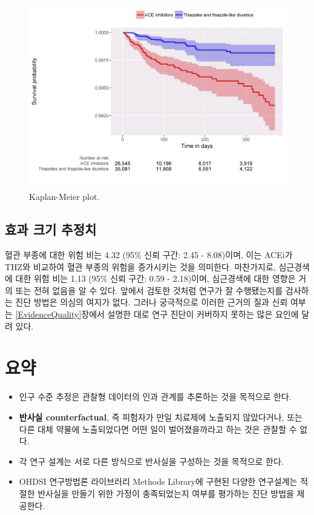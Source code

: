 \documentclass[10.5pt]{book}
\theoremstyle{definition}
\theoremstyle{definition}
\theoremstyle{definition}
\theoremstyle{remark}
\let\BeginKnitrBlock\begin \let\EndKnitrBlock\end
\begin{document}
\begin{figure}

{\centering \includegraphics[width=1\linewidth]{images/PopulationLevelEstimation/kmPlot} 

}

\caption{Kaplan-Meier plot.}\label{fig:kmPlot}
\end{figure}

\subsection{효과 크기 추정치}\label{--}

혈관 부종에 대한 위험 비는 4.32 (95\% 신뢰 구간: 2.45 - 8.08)이며, 이는
ACEi가 THZ와 비교하여 혈관 부종의 위험을 증가시키는 것을 의미한다.
마찬가지로, 심근경색에 대한 위험 비는 1.13 (95\% 신뢰 구간: 0.59 -
2.18)이며, 심근경색에 대한 영향은 거의 또는 전혀 없음을 알 수 있다.
앞에서 검토한 것처럼 연구가 잘 수행됐는지를 검사하는 진단 방법은 의심의
여지가 없다. 그러나 궁극적으로 이러한 근거의 질과 신뢰 여부는
\ref{EvidenceQuality}장에서 설명한 대로 연구 진단이 커버하지 못하는 많은
요인에 달려 있다.

\section{요약}\label{-10}

\BeginKnitrBlock{rmdsummary}
\begin{itemize}
\item
  인구 수준 추정은 관찰형 데이터의 인과 관계를 추론하는 것을 목적으로
  한다.
\item
  \textbf{반사실 counterfactual}, 즉 피험자가 만일 치료제에 노출되지
  않았다거나, 또는 다른 대체 약물에 노출되었다면 어떤 일이
  벌어졌을까라고 하는 것은 관찰할 수 없다.
\item
  각 연구 설계는 서로 다른 방식으로 반사실을 구성하는 것을 목적으로
  한다.
\item
  OHDSI 연구방법론 라이브러리 Methods Library에 구현된 다양한 연구설계는
  적절한 반사실을 만들기 위한 가정이 충족되었는지 여부를 평가하는 진단
  방법을 제공한다.
\end{itemize}
\EndKnitrBlock{rmdsummary}
\end{document}
